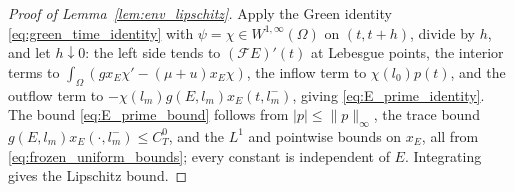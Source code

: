 \documentclass[pdflatex,sn-mathphys-num]{sn-jnl}
\newcommand{\Om}{\Omega}
\theoremstyle{plain}
\theoremstyle{definition}
\theoremstyle{remark}
\begin{document}
\begin{proof}[Proof of Lemma~\ref{lem:env_lipschitz}]
Apply the Green identity \eqref{eq:green_time_identity} with $\psi=\chi\in
W^{1,\infty}(\Om)$ on $(t,t+h)$, divide by $h$, and let $h\downarrow0$: the
left side tends to $(\mathcal FE)'(t)$ at Lebesgue points, the interior terms to
$\int_\Om(g x_E\chi'-(\mu+u)x_E\chi)$, the inflow term to $\chi(l_0)p(t)$, and the
outflow term to $-\chi(l_m)g(E,l_m)x_E(t,l_m^-)$, giving
\eqref{eq:E_prime_identity}. The bound \eqref{eq:E_prime_bound} follows from
$|p|\le\|p\|_\infty$, the trace bound $g(E,l_m)x_E(\cdot,l_m^-)\le C_T^0$, and the
$L^1$ and pointwise bounds on $x_E$, all from \eqref{eq:frozen_uniform_bounds};
every constant is independent of $E$. Integrating gives the Lipschitz bound.
\end{proof}
\end{document}
